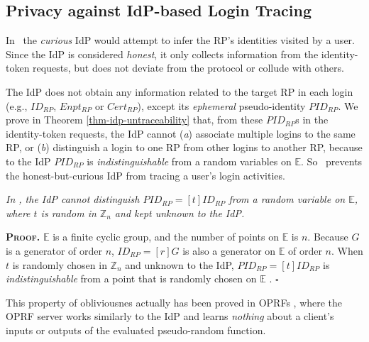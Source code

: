 
\subsection{Privacy against IdP-based Login Tracing}
\label{subsec:IdP-privacy}

In \usso\ the \emph{curious} IdP would attempt to infer the RP's identities visited by a user. Since the IdP is considered \emph{honest}, it only collects information from the identity-token requests, %
 but does not deviate from the protocol or collude with others.

The IdP does not obtain any information related to the target RP in each login (e.g., $ID_{RP}$, $Enpt_{RP}$ or $Cert_{RP}$), except its \emph{ephemeral} pseudo-identity $PID_{RP}$.
We prove in Theorem \ref{thm-idp-untraceability} that, from these $PID_{RP}$s in the identity-token requests,
 the IdP cannot (\emph{a}) associate multiple logins to the same RP, or (\emph{b}) distinguish a login to one RP from other logins to another RP, because to the IdP $PID_{RP}$ is \emph{indistinguishable} from a random variables on $\mathbb{E}$. So \usso\ prevents the honest-but-curious IdP from tracing a user's login activities.

\vspace{-1.2mm}
\begin{thm}
\emph{In \usso, the IdP cannot distinguish $PID_{RP} = [t]ID_{RP}$ from a random variable on $\mathbb{E}$, where $t$ is random in $\mathbb{Z}_n$ and kept unknown to the IdP.}\label{thm-idp-untraceability}
\end{thm}
\vspace{-1.2mm}

\noindent\textbf{\textsc{Proof.}}
$\mathbb{E}$ is a finite cyclic group, and the number of points on $\mathbb{E}$ is $n$.
Because $G$ is a generator of order $n$, $ID_{RP} = [r]G$ is also a generator on $\mathbb{E}$ of order $n$. %
When $t$ is randomly chosen in $\mathbb{Z}_n$ and unknown to the IdP, $PID_{RP} = [t]ID_{RP}$ is \emph{indistinguishable} from a point that is randomly chosen on $\mathbb{E}$ \cite{oprf-proved,voprf-proved}. \hfill $\square$
\vspace{.75mm}

This property of obliviousnes actually has been proved in OPRFs \cite{oprf-proved,voprf-proved}, where the OPRF server works similarly to the IdP and learns \emph{nothing} about a client's inputs or outputs of the evaluated pseudo-random function.

